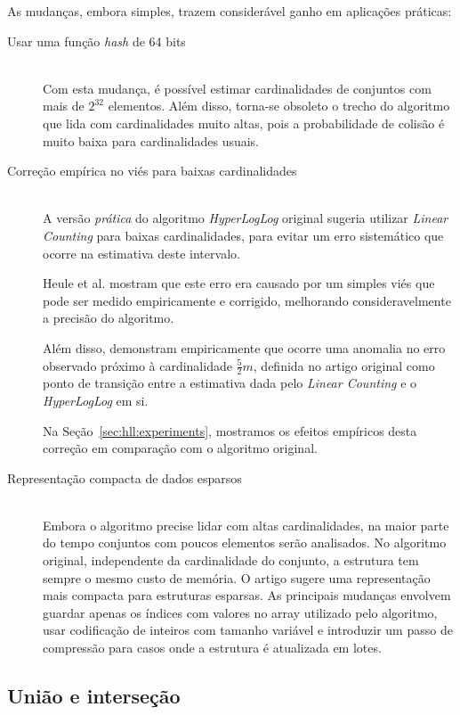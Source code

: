As mudanças, embora simples, trazem considerável ganho em aplicações práticas:

\begin{description}
  \item[Usar uma função \emph{hash} de 64 bits] \hfill \\
    Com esta mudança, é possível estimar cardinalidades de conjuntos com mais de $2^{32}$ elementos. Além disso, torna-se obsoleto o trecho do algoritmo que lida com cardinalidades muito altas, pois a probabilidade de colisão é muito baixa para cardinalidades usuais. 
  
  \item[Correção empírica no viés para baixas cardinalidades] \hfill \\
    A versão \emph{prática} do algoritmo \emph{HyperLogLog} original sugeria utilizar \emph{Linear Counting} para baixas cardinalidades, para evitar um erro sistemático que ocorre na estimativa deste intervalo. 
    
    Heule et al. mostram que este erro era causado por um simples viés que pode ser medido empiricamente e corrigido, melhorando consideravelmente a precisão do algoritmo. 

    Além disso, demonstram empiricamente que ocorre uma anomalia no erro observado próximo à cardinalidade $\frac{5}{2}m$, definida no artigo original como ponto de transição entre a estimativa dada pelo \emph{Linear Counting} e o \emph{HyperLogLog} em si.
    
    Na Seção~\ref{sec:hll:experiments}, mostramos os efeitos empíricos desta correção em comparação com o algoritmo original.

  \item[Representação compacta de dados esparsos] \hfill \\
    Embora o algoritmo precise lidar com altas cardinalidades, na maior parte do tempo conjuntos com poucos elementos serão analisados. No algoritmo original, independente da cardinalidade do conjunto, a estrutura tem sempre o mesmo custo de memória. O artigo sugere uma representação mais compacta para estruturas esparsas. As principais mudanças envolvem guardar apenas os índices com valores no array utilizado pelo algoritmo, usar codificação de inteiros com tamanho variável e introduzir um passo de compressão para casos onde a estrutura é atualizada em lotes.
    
\end{description}

\subsection{União e interseção}\label{sec:hll:intersection}

